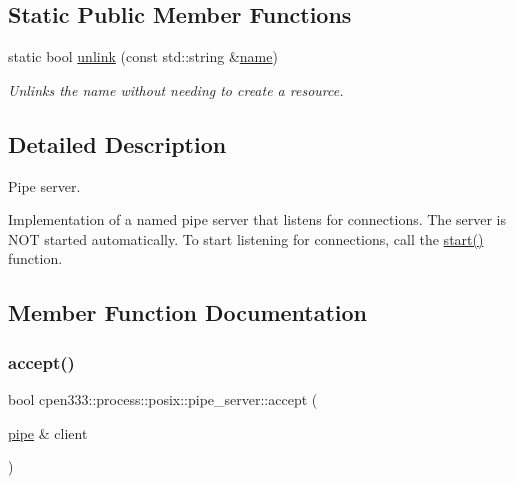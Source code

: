 \subsection*{Static Public Member Functions}
\begin{DoxyCompactItemize}
\item 
static bool \hyperlink{classcpen333_1_1process_1_1posix_1_1pipe__server_a7962624ab13060295c1f0b1f0d871e13}{unlink} (const std\+::string \&\hyperlink{classcpen333_1_1process_1_1impl_1_1named__resource__base_a53986a0a1dd26a3602b842c45613b79d}{name})
\begin{DoxyCompactList}\small\item\em Unlinks the name without needing to create a resource. \end{DoxyCompactList}\end{DoxyCompactItemize}


\subsection{Detailed Description}
Pipe server. 

Implementation of a named pipe server that listens for connections. The server is N\+OT started automatically. To start listening for connections, call the \hyperlink{classcpen333_1_1process_1_1posix_1_1pipe__server_ae155615a438deba2ee73f0f92cd3f992}{start()} function. 

\subsection{Member Function Documentation}
\mbox{\label{classcpen333_1_1process_1_1posix_1_1pipe__server_a9acf7d28f7b58a58f04360110cae1fff}} 
\subsubsection{\texorpdfstring{accept()}{accept()}}
{\footnotesize\ttfamily bool cpen333\+::process\+::posix\+::pipe\+\_\+server\+::accept (\begin{DoxyParamCaption}\item[{\hyperlink{classcpen333_1_1process_1_1posix_1_1pipe}{pipe} \&}]{client }\end{DoxyParamCaption})\hspace{0.3cm}{\ttfamily [inline]}}



